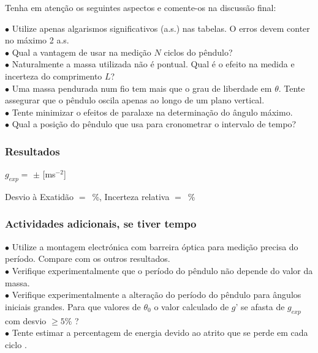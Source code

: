 \documentclass[a4paper,12pt]{article}      %
\begin{document}
Tenha em atenção os seguintes aspectos e comente-os na discussão final:
 \begin{flushleft}
	 $\bullet$ Utilize apenas algarismos significativos (a.s.) nas tabelas. O erros devem conter no máximo 2 a.s. \\
	 $\bullet$ Qual a vantagem de usar na medição $N$ ciclos do pêndulo? \\
	 $\bullet$ Naturalmente a massa utilizada não é pontual. Qual é o efeito na medida e incerteza do comprimento $L$? \\	
	 $\bullet$ Uma massa pendurada num fio tem mais que o grau de liberdade em $\theta$. Tente assegurar que o pêndulo oscila apenas ao longo de um plano vertical. \\
	 $\bullet$ Tente minimizar o efeitos de paralaxe na determinação do ângulo máximo.  \\
	 $\bullet$ Qual a posição do pêndulo que usa para cronometrar o intervalo de tempo?  \\
\end{flushleft} 

\subsubsection*{\sf Resultados}
$g_{exp}=$ \underline{\makebox[1.5cm][r]{~}}  $\pm$  	\underline{\makebox[1cm][r]{~}} [ms$^{-2}$]

\noindent  
Desvio à Exatidão $=$~\underline{\makebox[1cm][r]{~}}\%, 
Incerteza relativa $=$~\underline{\makebox[1cm][r]{~}}\% 





\subsubsection*{\sf Actividades adicionais, se tiver tempo}
 \begin{flushleft}
	 $\bullet$ Utilize a montagem electrónica com barreira óptica para medição precisa do período. Compare com os outros resultados.\\
	 $\bullet$ Verifique experimentalmente que o período do pêndulo não depende do valor da massa.\\
	 $\bullet$ Verifique experimentalmente a alteração do período do pêndulo para ângulos iniciais grandes. 
	 Para que valores de $\theta_0$ o valor calculado de $g$’ se afasta de $g_{exp}$ com desvio $\ge 5 \%$ ?\\
	 $\bullet$ Tente estimar a percentagem de energia devido ao atrito que se perde em cada ciclo .
\end{flushleft} 
\end{document}
